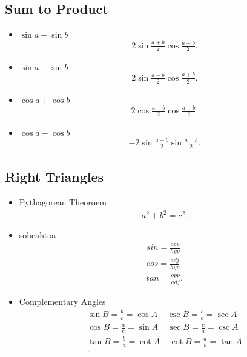 \documentclass{report}
\begin{document}
      \bigbreak \noindent \bigbreak \noindent 
      \subsection{Sum to Product}
      \begin{itemize}
        \item $\sin{a}+\sin{b}$
          \begin{align*}
            2\sin{\frac{a+b}{2}}\cos{\frac{a-b}{2}}
          .\end{align*}
        \item $\sin{a}-\sin{b}$
          \begin{align*}
            2\sin{\frac{a-b}{2}}\cos{\frac{a+b}{2}}
          .\end{align*}
        \item $\cos{a}+\cos{b}$
          \begin{align*}
            2\cos{\frac{a+b}{2}}\cos{\frac{a-b}{2}}
          .\end{align*}
        \item $\cos{a}-\cos{b}$
          \begin{align*}
            -2\sin{\frac{a+b}{2}}\sin{\frac{a-b}{2}}
          .\end{align*}
      \end{itemize}

     \bigbreak \noindent \bigbreak \noindent 
     \subsection{Right Triangles}
     \begin{itemize}
       \item Pythagorean Theoroem
         \begin{align*}
           a^{2} + b^{2} = c^{2}
         .\end{align*}
       \item sohcahtoa
         \begin{align*}
           sin = \frac{opp}{hyp} \\
           cos = \frac{adj}{hyp} \\
           tan = \frac{opp}{adj}
         .\end{align*}
        \item Complementary Angles
          \begin{align*}
            \sin{B} = \frac{b}{c} = \cos{A}\ \ \ \ \ \csc{B} = \frac{c}{b} = \sec{A} \\
            \cos{B} = \frac{a}{c} = \sin{A}\ \ \ \ \ \sec{B} = \frac{c}{a} = \csc{A} \\
            \tan{B} = \frac{b}{a} = \cot{A}\ \ \ \ \ \cot{B} = \frac{a}{b} = \tan{A} \\
          .\end{align*}
     \end{itemize}
\end{document}
